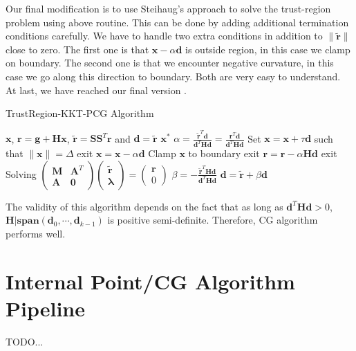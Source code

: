 \documentclass[annual]{acmsiggraph}
\newcommand{\E}[1]{\mathbf{#1}}
\newcommand{\TWOC}[2]{\left(\begin{array}{c}#1 \\ #2\end{array}\right)}
\newcommand{\MTT}[4]{\left(\begin{array}{cc}#1 & #2 \\ #3 & #4\end{array}\right)}
\begin{document}
Our final modification is to use Steihaug's approach \cite{steihaug1983conjugate} to solve the trust-region problem using above routine. This can be done by adding additional termination conditions carefully. We have to handle two extra conditions in addition to $\|\tilde{\E{r}}\|$ close to zero. The first one is that $\E{x}-\alpha\E{d}$ is outside region, in this case we clamp on boundary. The second one is that we encounter negative curvature, in this case we go along this direction to boundary. Both are very easy to understand. At last, we have reached our final version .
\begin{algorithm}[b]
\caption{TrustRegion-KKT-PCG Algorithm}
\label{alg:TRKKTPCG}
\begin{algorithmic}
\REQUIRE $\E{x}$, $\E{r}=\E{g}+\E{H}\E{x}$, $\tilde{\E{r}}=\E{S}\E{S}^T\E{r}$ and $\E{d}=\tilde{\E{r}}$
\ENSURE $\E{x}^*$
\STATE $\alpha=\frac{\tilde{\E{r}}^T\E{d}}{\E{d}^T\E{H}\E{d}}=\frac{\E{r}^T\E{d}}{\E{d}^T\E{H}\E{d}}$
\IF {$\E{d}^T\E{H}\E{d}\leq0$}
\STATE Set $\E{x}=\E{x}+\tau\E{d}$ such that $\|\E{x}\|=\Delta$
\STATE exit
\ENDIF
\STATE $\E{x}=\E{x}-\alpha\E{d}$
\IF{$\|\E{x}\|>\Delta$}
\STATE Clamp $\E{x}$ to boundary
\STATE exit
\ENDIF
\STATE $\E{r}=\E{r}-\alpha\E{H}\E{d}$
\IF{$\|\E{r}\|$ small enough}
\STATE exit
\ENDIF
\STATE Solving $\MTT{\E{M}}{\E{A}^T}{\E{A}}{\E{0}}\TWOC{\tilde{\E{r}}}{\E{\lambda}}=\TWOC{\E{r}}{0}$
\STATE $\beta=-\frac{\tilde{\E{r}}^T\E{H}\E{d}}{\E{d}^T\E{H}\E{d}}$
\STATE $\E{d}=\tilde{\E{r}}+\beta\E{d}$
\ENDWHILE
\end{algorithmic}
\end{algorithm}
The validity of this algorithm depends on the fact that as long as $\E{d}^T\E{H}\E{d}>0$, $\E{H}|\E{span}(\E{d}_0,\cdots,\E{d}_{k-1})$ is positive semi-definite. Therefore, CG algorithm performs well.

\section{Internal Point/CG Algorithm Pipeline}
TODO...



\end{document}
